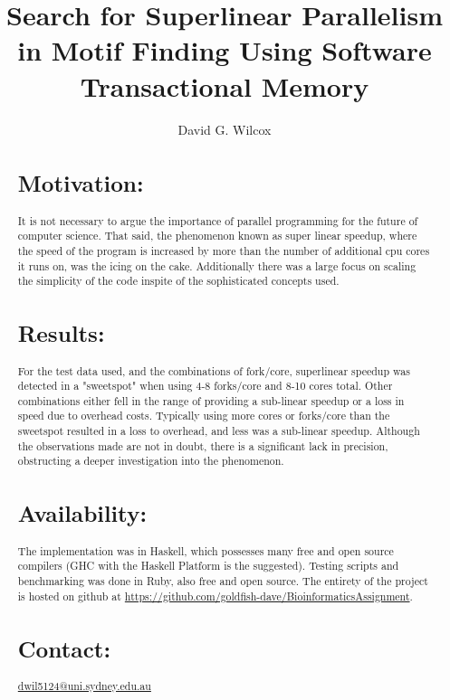 \documentclass{bioinfo}
\begin{document}

\title[Parallel Motif Finding]{Search for Superlinear Parallelism in Motif Finding Using Software Transactional Memory}
\author[D. G. Wilcox]{David G. Wilcox}
\address{University of Sydney, Student Department}



\maketitle

\begin{abstract}

\section{Motivation:}
It is not necessary to argue the importance of parallel programming for the future of computer science\cite{beautCon}. That said, the phenomenon known as super linear speedup, where the speed of the program is increased by more than the number of additional cpu cores it runs on, was the icing on the cake. Additionally there was a large focus on scaling the simplicity of the code inspite of the sophisticated concepts used.

\section{Results:}
For the test data used, and the combinations of fork/core, superlinear speedup was detected in a "sweetspot" when using 4-8 forks/core and 8-10 cores total. Other combinations either fell in the range of providing a sub-linear speedup or a loss in speed due to overhead costs. Typically using more cores or forks/core than the sweetspot resulted in a loss to overhead, and less was a sub-linear speedup. Although the observations made are not in doubt, there is a significant lack in precision, obstructing a deeper investigation into the phenomenon.

\section{Availability:}
The implementation was in Haskell, which possesses many free and open source compilers (GHC with the Haskell Platform is the suggested). Testing scripts and benchmarking was done in Ruby, also free and open source. The entirety of the project is hosted on github at \url{https://github.com/goldfish-dave/BioinformaticsAssignment}.

\section{Contact:} \href{dwil5124@uni.sydney.edu.au}{dwil5124@uni.sydney.edu.au}
\end{abstract}
\end{document}
